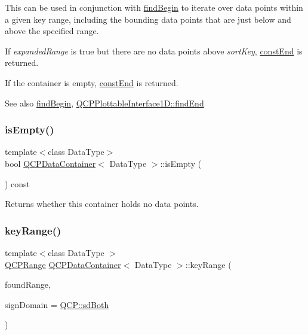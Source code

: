 This can be used in conjunction with \hyperlink{class_q_c_p_data_container_a2ad8a5399072d99a242d3a6d2d7e278a}{find\+Begin} to iterate over data points within a given key range, including the bounding data points that are just below and above the specified range.

If {\itshape expanded\+Range} is true but there are no data points above {\itshape sort\+Key}, \hyperlink{class_q_c_p_data_container_aa7f7cf239b85b1a28de3d675cc5b3da1}{const\+End} is returned.

If the container is empty, \hyperlink{class_q_c_p_data_container_aa7f7cf239b85b1a28de3d675cc5b3da1}{const\+End} is returned.

\begin{DoxySeeAlso}{See also}
\hyperlink{class_q_c_p_data_container_a2ad8a5399072d99a242d3a6d2d7e278a}{find\+Begin}, \hyperlink{class_q_c_p_plottable_interface1_d_a5deced1016bc55a41a2339619045b295}{Q\+C\+P\+Plottable\+Interface1\+D\+::find\+End} 
\end{DoxySeeAlso}
\mbox{\label{class_q_c_p_data_container_a7bdebfccd2f9f84bf032882f9d6b00a8}} 
\subsubsection{\texorpdfstring{is\+Empty()}{isEmpty()}}
{\footnotesize\ttfamily template$<$class Data\+Type$>$ \\
bool \hyperlink{class_q_c_p_data_container}{Q\+C\+P\+Data\+Container}$<$ Data\+Type $>$\+::is\+Empty (\begin{DoxyParamCaption}{ }\end{DoxyParamCaption}) const\hspace{0.3cm}{\ttfamily [inline]}}

Returns whether this container holds no data points. \mbox{\label{class_q_c_p_data_container_aba6e1a93c21ccc56a432b4a02c9d0ed2}} 
\subsubsection{\texorpdfstring{key\+Range()}{keyRange()}}
{\footnotesize\ttfamily template$<$class Data\+Type $>$ \\
\hyperlink{class_q_c_p_range}{Q\+C\+P\+Range} \hyperlink{class_q_c_p_data_container}{Q\+C\+P\+Data\+Container}$<$ Data\+Type $>$\+::key\+Range (\begin{DoxyParamCaption}\item[{bool \&}]{found\+Range,  }\item[{\hyperlink{namespace_q_c_p_afd50e7cf431af385614987d8553ff8a9}{Q\+C\+P\+::\+Sign\+Domain}}]{sign\+Domain = {\ttfamily \hyperlink{namespace_q_c_p_afd50e7cf431af385614987d8553ff8a9aa38352ef02d51ddfa4399d9551566e24}{Q\+C\+P\+::sd\+Both}} }\end{DoxyParamCaption})}

